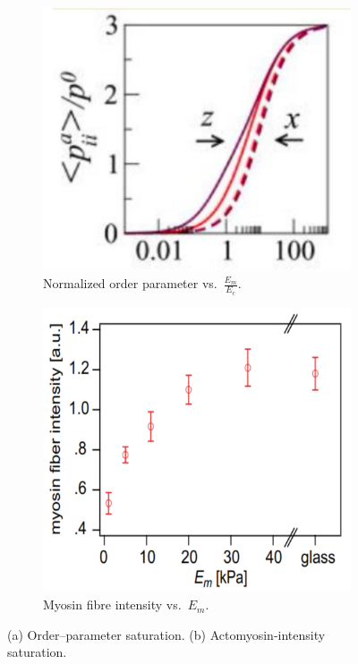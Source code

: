 \documentclass[a4paper,margin=1in]{article}
\begin{document}
\begin{figure}[h!]
  \centering
  \begin{subfigure}[b]{0.45\textwidth}
    \includegraphics[width=\textwidth]{order_parameter}
    \caption{Normalized order parameter vs.\ \(\frac{E_m}{E_c}\).}
    \label{fig:order_parameter}
  \end{subfigure}
  \quad
  \begin{subfigure}[b]{0.45\textwidth}
    \includegraphics[width=\textwidth]{actomyosin}
    \caption{Myosin fibre intensity vs.\ \(E_m\).}
    \label{fig:myosin}
  \end{subfigure}
  \caption{(a) Order–parameter saturation. (b) Actomyosin‐intensity saturation.}
  \label{fig:combined}
\end{figure}
\end{document}

